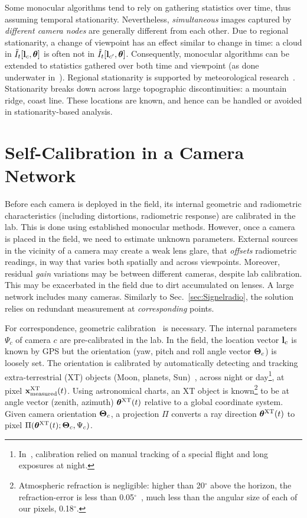 \documentclass[runningheads]{llncs}
\begin{document}
Some monocular algorithms tend to rely on gathering statistics over time, thus assuming temporal stationarity. Nevertheless, {\em simultaneous} images captured by {\em different camera nodes} are generally different from each other. Due to regional stationarity, a change of viewpoint has an effect similar to change in time: a cloud in
$\tilde I_t[{\bf l}_c,{\bm \theta}]$ is often not in $\tilde I_t[{\bf l}_{c'},{\bm \theta}]$. Consequently, monocular algorithms can be extended to statistics gathered over both time and viewpoint (as done underwater in~\cite{6528314}).
Regional stationarity is supported by meteorological research~\cite{lensky2006time,Mesoscale}.
Stationarity breaks down across large topographic discontinuities: a mountain ridge, coast line. These locations are known, and hence can be handled or avoided in stationarity-based analysis.



\section{Self-Calibration in a Camera Network}
\label{sec:muticalib}

Before each camera is deployed in the field, its internal geometric and radiometric characteristics (including distortions, radiometric response) are calibrated in the lab. This is done using established monocular methods. However, once a camera is placed in the field, we need to estimate unknown parameters. External sources in the vicinity of a camera may create a weak lens glare, that {\em offsets} radiometric readings, in way that varies both spatially and across viewpoints. Moreover, residual {\em gain} variations may be between different cameras, despite lab calibration. This may be exacerbated in the field due to dirt accumulated on lenses. A large network includes many cameras. Similarly to Sec.~\ref{sec:Signelradio}, the solution relies on redundant measurement at {\em corresponding} points.

For correspondence, geometric calibration~\cite{Seiz2002} is necessary. The internal parameters $\Psi_c$ of camera $c$ are pre-calibrated in the lab.
In the field, the location vector ${\bf l}_c$ is known by GPS but the orientation (yaw, pitch and roll angle vector ${\bf \Theta}_c$) is loosely set. The orientation is calibrated by automatically detecting and tracking extra-terrestrial (XT) objects (Moon, planets, Sun)~\cite{Seiz2002,lalonde}, across night or day\footnote{In~\cite{Seiz2002}, calibration relied on manual tracking of a special flight and long exposures at night.}, at pixel ${\bf x}^{\rm XT}_{\rm measured}(t)$. Using astronomical charts, an XT object is known\footnote{Atmospheric refraction is negligible: higher than 20$^{\circ}$ above the horizon, the refraction-error is less than 0.05$^{\circ}$~\cite{NAV:6418444}, much less than the angular size of each of our pixels, 0.18$^{\circ}$.} to be at angle vector (zenith, azimuth) ${\bm \theta}^{\rm XT}(t)$ relative to a global coordinate system. Given camera orientation ${\bf \Theta}_c$, a projection ${\Pi}$ converts a ray direction ${\bm \theta}^{\rm XT}(t)$ to pixel ${{\Pi}({\bm \theta}^{\rm XT}(t);{\bf \Theta}_c,\Psi_c)}$.
\end{document}
